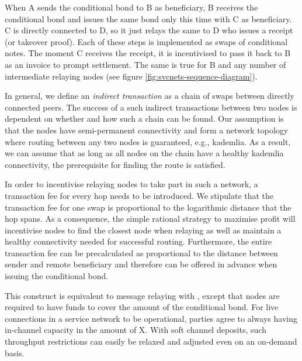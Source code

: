 When A sends the conditional bond to B as beneficiary, B receives the conditional bond and issues the same bond only this time with C as beneficiary. C is directly connected to D, so it just relays the same to D who issues a receipt (or takeover proof). 
Each of these steps is implemented as swaps of conditional notes. The moment C receives the receipt, it is incentivised to pass it back to B as an invoice to prompt settlement. The same is true for B and any number of intermediate relaying nodes (see figure \ref{fig:svcnets-sequence-diagram}).




In general, we define an \emph{indirect transaction} as a chain of swaps between directly connected
peers. The success of a such indirect transactions between two nodes is dependent on whether and
how such a chain can be found. Our assumption is that the nodes have semi-permanent connectivity
and form a network topology where routing between any two nodes is guaranteed, e.g., kademlia. As a result, we can assume that as long as all nodes on the chain have a healthy kademlia connectivity, the prerequisite for finding the route is satisfied.

In order to incentivise relaying nodes to take part in such a network, a transaction fee for every hop needs to be introduced.  We stipulate that the transaction fee for one swap is proportional to the logarithmic distance that the hop spans. As a consequence, the simple rational strategy to maximise profit will incentivise nodes to find the closest node when relaying as well as maintain a healthy connectivity needed for successful routing. Furthermore, the entire transaction fee can be precalculated as proportional to the distance between sender and remote beneficiary and therefore can be offered in advance when issuing the conditional bond.

This construct is equivalent to message relaying with , except that nodes are required to have funds to cover the amount of the conditional bond.
For live connections in a service network to be operational, parties agree to always having in-channel capacity in the amount of X. With soft channel deposits, such throughput restrictions can easily be relaxed and adjusted even on an on-demand basis.

